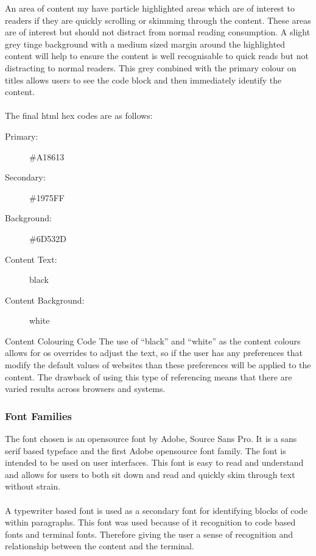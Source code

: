 An area of content my have particle highlighted areas which are of interest to readers if they are quickly scrolling or skimming through the content. These areas are of interest but should not distract from normal reading consumption. A slight grey tinge background with a medium sized margin around the highlighted content will help to ensure the content is well recognisable to quick reads but not distracting to normal readers. This grey combined with the primary colour on titles allows users to see the code block and then immediately identify the content.\\\\
The final \gls{html} \gls{hex} codes are as follows:
\begin{description}
	\item[Primary:] \#A18613
	\item[Secondary:] \#1975FF
	\item[Background:] \#6D532D
	\item[Content Text:] black
	\item[Content Background:] white
\end{description}

\begin{note}{Content Colouring Code}
	The use of ``black'' and ``white'' as the content colours allows for \gls{os} overrides to adjust the text, so if the user has any preferences that modify the default values of websites than these preferences will be applied to the content. The drawback of using this type of referencing means that there are varied results across browsers and systems.
\end{note}

\subsubsection{Font Families}
The font chosen is an \gls{opensource} font by Adobe, Source Sans Pro. It is a sans serif based typeface and the first Adobe \gls{opensource} font family. The font is intended to be used on user interfaces. This font is easy to read and understand and allows for users to both sit down and read and quickly skim through text without strain.~\cite{font}\\\\
A typewriter based font is used as a secondary font for identifying blocks of code within paragraphs. This font was used because of it recognition to code based fonts and terminal fonts. Therefore giving the user a sense of recognition and relationship between the content and the terminal.

